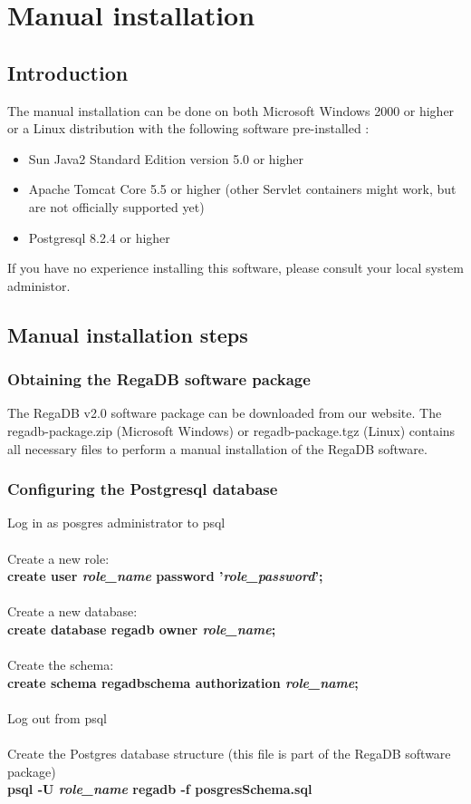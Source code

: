 \chapter{Manual installation}
\label{chapter:manual_install}

\section{Introduction}
The manual installation can be done on both Microsoft Windows 2000 or higher or a Linux distribution with the following software pre-installed : 
\begin{itemize}
\item Sun Java2 Standard Edition version 5.0 or higher
\item Apache Tomcat Core 5.5 or higher (other Servlet containers might work, but are not officially supported yet)
\item Postgresql 8.2.4 or higher
\end{itemize}
If you have no experience installing this software, please consult your local system administor.

\section{Manual installation steps}
\subsection{Obtaining the RegaDB software package}
The RegaDB v2.0 software package can be downloaded from our website. The regadb-package.zip (Microsoft Windows) or regadb-package.tgz (Linux) contains all necessary files to perform a manual installation of the RegaDB software.

\subsection{Configuring the Postgresql database}
Log in as posgres administrator to psql
\\
\\
Create a new role:
\\
\textbf{create user \textit{role\_name} password '\textit{role\_password}';}
\\
\\
Create a new database:
\\
\textbf{create database regadb owner \textit{role\_name};}
\\
\\
Create the schema:
\\
\textbf{create schema regadbschema authorization \textit{role\_name};}
\\
\\
Log out from psql
\\
\\
Create the Postgres database structure (this file is part of the RegaDB software package)
\\
\textbf{psql -U \textit{role\_name} regadb -f posgresSchema.sql}

